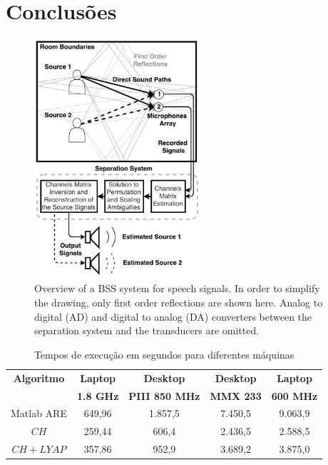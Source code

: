 \chapter{Conclusões}

 
\begin{figure}[!ht]
	\centering
	\includegraphics[width=2.5in]{figuras/BSSoverview}
	\caption{Overview of a BSS system for speech signals. In order to simplify the drawing, only first order reflections are shown here. Analog to digital (AD) and digital to analog (DA) converters between the separation system and the transducers are omitted.}
	\label{fig_BSSOverview}
\end{figure}

\begin{table}[tbp]
	\caption{Tempos de execução em segundos para diferentes máquinas}
	\label{TabDesempenho}
	\begin{center}
		\begin{tabular}{c|c|c|c|c}
			\hline
			\textbf{Algoritmo} & \textbf{Laptop} & \textbf{Desktop} & \textbf{Desktop} & 
			\textbf{Laptop} \\ 
			& \textbf{1.8 GHz} & \textbf{PIII 850 MHz} & \textbf{MMX 233} & \textbf{600
				MHz} \\ \hline
			Matlab ARE & 649,96 & 1.857,5 & 7.450,5 & 9.063,9 \\ 
			$CH$ & 259,44 & 606,4 & 2.436,5 & 2.588,5 \\ 
			$CH+LYAP$ & 357,86 & 952,9 & 3.689,2 & 3.875,0 \\ \hline
		\end{tabular}
	\end{center}
\end{table}
